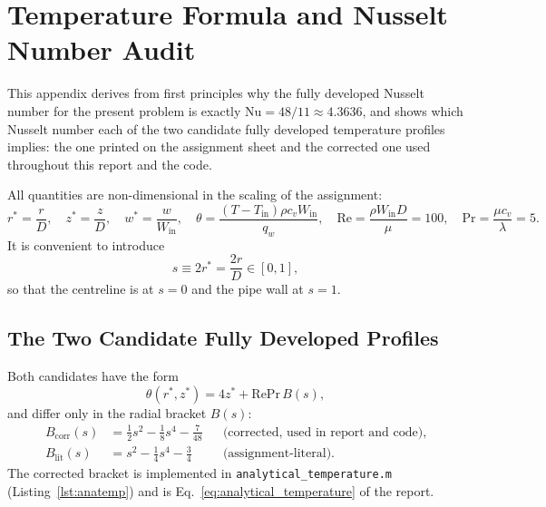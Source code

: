 \documentclass[12pt,a4paper]{article}
\newcommand{\Rey}{\text{Re}}
\newcommand{\Pran}{\text{Pr}}
\begin{document}
\newpage

\section{Temperature Formula and Nusselt Number Audit}
\label{app:nusselt}

This appendix derives from first principles why the fully developed Nusselt number for the
present problem is exactly $\text{Nu}=48/11\approx4.3636$, and shows which Nusselt number each of
the two candidate fully developed temperature profiles implies: the one printed on the assignment
sheet and the corrected one used throughout this report and the code.

All quantities are non-dimensional in the scaling of the assignment:
\begin{equation}
    r^*=\frac{r}{D},\quad
    z^*=\frac{z}{D},\quad
    w^*=\frac{w}{W_{\text{in}}},\quad
    \theta=\frac{(T-T_{\text{in}})\rho c_v W_{\text{in}}}{q_w},\quad
    \Rey=\frac{\rho W_{\text{in}}D}{\mu}=100,\quad
    \Pran=\frac{\mu c_v}{\lambda}=5 .
\end{equation}
It is convenient to introduce
\begin{equation}
    s \equiv 2r^* = \frac{2r}{D}\in[0,1],
\end{equation}
so that the centreline is at $s=0$ and the pipe wall at $s=1$.

\subsection{The Two Candidate Fully Developed Profiles}

Both candidates have the form
\begin{equation}
    \theta(r^*,z^*) = 4z^* + \Rey\Pran\,B(s),
\end{equation}
and differ only in the radial bracket $B(s)$:
\begin{align}
    B_{\text{corr}}(s) &= \tfrac12 s^2 - \tfrac18 s^4 - \tfrac{7}{48}
        &&\text{(corrected, used in report and code)},\\
    B_{\text{lit}}(s)  &= s^2 - \tfrac14 s^4 - \tfrac34
        &&\text{(assignment-literal)}.
\end{align}
The corrected bracket is implemented in \texttt{analytical\_temperature.m}
(Listing~\ref{lst:anatemp}) and is Eq.~\eqref{eq:analytical_temperature} of the report.
\end{document}
